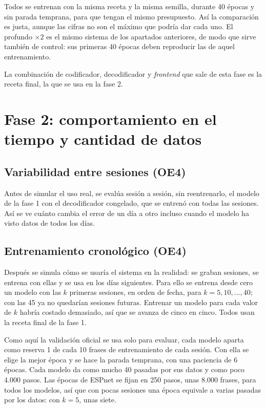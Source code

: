 Todos se entrenan con la misma receta y la misma semilla, durante 40 épocas y sin parada temprana, para que tengan el mismo presupuesto. Así la comparación es justa, aunque las cifras no son el máximo que podría dar cada uno. El profundo $\times 2$ es el mismo sistema de los apartados anteriores, de modo que sirve también de control: sus primeras 40 épocas deben reproducir las de aquel entrenamiento.

La combinación de codificador, decodificador y \textit{frontend} que sale de esta fase es la receta final, la que se usa en la fase 2.

\section{Fase 2: comportamiento en el tiempo y cantidad de datos}
\label{sec:fase2}

\subsection{Variabilidad entre sesiones (OE4)}

Antes de simular el uso real, se evalúa sesión a sesión, sin reentrenarlo, el modelo de la fase 1 con el decodificador congelado, que se entrenó con todas las sesiones. Así se ve cuánto cambia el error de un día a otro incluso cuando el modelo ha visto datos de todos los días.

\subsection{Entrenamiento cronológico (OE4)}

Después se simula cómo se usaría el sistema en la realidad: se graban sesiones, se entrena con ellas y se usa en los días siguientes. Para ello se entrena desde cero un modelo con las $k$ primeras sesiones, en orden de fecha, para $k = 5, 10, \dots, 40$; con las 45 ya no quedarían sesiones futuras. Entrenar un modelo para cada valor de $k$ habría costado demasiado, así que se avanza de cinco en cinco. Todos usan la receta final de la fase 1.

Como aquí la validación oficial se usa solo para evaluar, cada modelo aparta como reserva 1 de cada 10 frases de entrenamiento de cada sesión. Con ella se elige la mejor época y se hace la parada temprana, con una paciencia de 6 épocas. Cada modelo da como mucho 40 pasadas por sus datos y como poco 4.000 pasos. Las épocas de ESPnet se fijan en 250 pasos, unas 8.000 frases, para todos los modelos, así que con pocas sesiones una época equivale a varias pasadas por los datos: con $k = 5$, unas siete.

